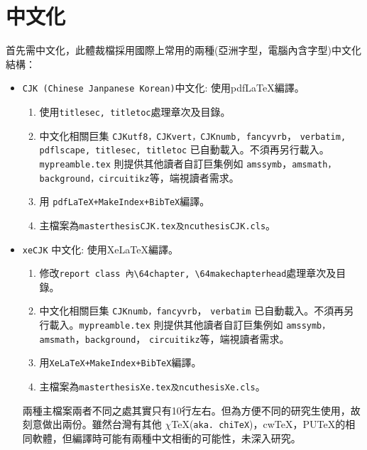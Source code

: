 \section{中文化}
首先需中文化，此體裁檔採用國際上常用的兩種(亞洲字型，電腦內含字型)中文化結構：
\begin{itemize}
\item {\tt CJK (Chinese Janpanese Korean)}中文化: 使用pdf\LaTeX{}編譯。 
\begin{enumerate}
\item 使用{\tt titlesec, titletoc}處理章次及目錄。
\item 中文化相關巨集
{\tt CJKutf8，CJKvert，CJKnumb, fancyvrb}，
{\tt verbatim, pdflscape, titlesec, titletoc} 已自動載入。不須再另行載入。
{\tt mypreamble.tex} 則提供其他讀者自訂巨集例如 
{\tt amssymb}，{\tt amsmath，background，circuitikz}等，端視讀者需求。


\item 用 {\tt pdfLaTeX+MakeIndex+BibTeX}編譯。
\item 主檔案為{\tt masterthesis{\color{red}CJK.tex}及ncuthesis{\color{red}CJK}.cls}。
\end{enumerate}

\item {\tt xeCJK} 中文化: 使用Xe\LaTeX{}編譯。
\begin{enumerate}

\item 修改{\tt report class 內\textbackslash\char64chapter, \textbackslash\char64makechapterhead}處理章次及目錄。

\item 中文化相關巨集 
{\tt CJKnumb，fancyvrb}，
{\tt verbatim} 已自動載入。不須再另行載入。{\tt mypreamble.tex} 則提供其他讀者自訂巨集例如
{\tt amssymb，amsmath}，{\tt background}，
{\tt circuitikz}等，端視讀者需求。

\item 用{\tt XeLaTeX+MakeIndex+BibTeX}編譯。
\item 主檔案為{\tt masterthesis{\color{red}Xe.tex}及ncuthesis{\color{red}Xe}.cls}。
\end{enumerate}
兩種主檔案兩者不同之處其實只有10行左右。但為方便不同的研究生使用，故刻意做出兩份。雖然台灣有其他 $\chi$\TeX{}({\tt aka. chi\TeX{}})，cw\TeX{}，PU\TeX{}的相同軟體，但編譯時可能有兩種中文相衝的可能性，未深入研究。
\end{itemize}

